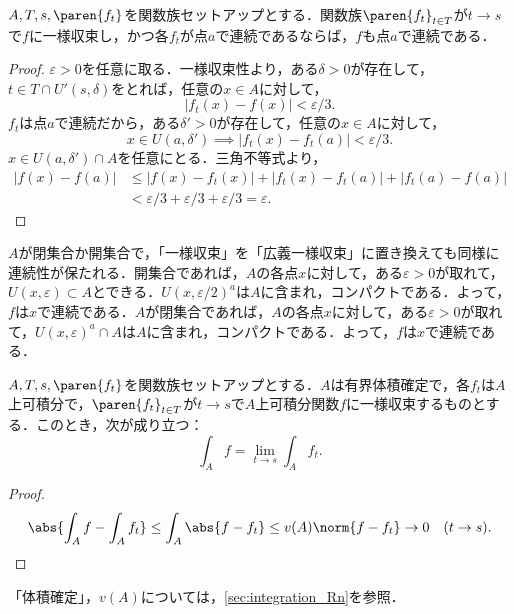 \documentclass[a4paper,10pt]{ltjsarticle}
\begin{document}
\begin{MyProposition}
  \(A, T, s, \paren{f_t}\)を関数族セットアップとする．関数族\(\paren{f_t}_{t\in T}\)が\(t \to s\)で\(f\)に一様収束し，かつ各\(f_t\)が点\(a\)で連続であるならば，\(f\)も点\(a\)で連続である．
\end{MyProposition}
\begin{proof}
  \(\varepsilon > 0\)を任意に取る．一様収束性より，ある\(\delta > 0\)が存在して，\(t \in T \cap U'(s, \delta)\)をとれば，任意の\(x \in A\)に対して，
  \[|f_t(x) - f(x)| < \varepsilon/3.\]
  \(f_t\)は点\(a\)で連続だから，ある\(\delta' > 0\)が存在して，任意の\(x \in A\)に対して，
  \[ x \in U(a, \delta') \implies |f_t(x) - f_t(a)| < \varepsilon/3. \]
  \(x \in U(a, \delta') \cap A\)を任意にとる．三角不等式より，
  \begin{align*}
    |f(x) - f(a)| & \le |f(x) - f_t(x)| + |f_t(x) - f_t(a)| + |f_t(a) - f(a)|      \\
                  & < \varepsilon/3 + \varepsilon/3 + \varepsilon/3 = \varepsilon.
  \end{align*}
\end{proof}

\(A\)が閉集合か開集合で，「一様収束」を「広義一様収束」に置き換えても同様に連続性が保たれる．開集合であれば，\(A\)の各点\(x\)に対して，ある\(\varepsilon > 0\)が取れて，\(U(x, \varepsilon) \subset A\)とできる．\(U(x, \varepsilon/2)^a\)は\(A\)に含まれ，コンパクトである．よって，\(f\)は\(x\)で連続である．\(A\)が閉集合であれば，\(A\)の各点\(x\)に対して，ある\(\varepsilon > 0\)が取れて，\(U(x, \varepsilon)^a \cap A\)は\(A\)に含まれ，コンパクトである．よって，\(f\)は\(x\)で連続である．

\begin{MyProposition}
  \(A, T, s, \paren{f_t}\)を関数族セットアップとする．\(A\)は有界体積確定で，各\(f_t\)は\(A\)上可積分で，\(\paren{f_t}_{t\in T}\)が\(t \to s\)で\(A\)上可積分関数\(f\)に一様収束するものとする．このとき，次が成り立つ：
  \[ \int_A f = \lim_{t \to s}\int_A f_t. \]
\end{MyProposition}
\begin{proof}
  \[ \abs{\int_A f - \int_Af_t}\le\int_A\abs{f-f_t}\le v(A)\norm{f-f_t} \to 0 \quad (t \to s). \]
\end{proof}

「体積確定」，\(v(A)\)については，\cref{sec:integration_Rn}を参照．
\end{document}
